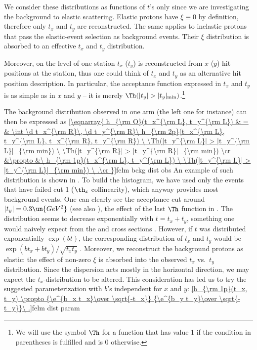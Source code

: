 We consider these distributions as functions of $t$'s only since we are investigating the background to elastic scattering. Elastic protons have $\xi\equiv 0$ by definition, therefore only $t_x$ and $t_y$ are reconstructed. The same applies to inelastic protons that pass the elastic-event selection as background events. Their $\xi$ distribution is absorbed to an effective $t_x$ and $t_y$ distribution.

Moreover, on the level of one station $t_x$ ($t_y$) is reconstructed from $x$ ($y$) hit positions at the station, thus one could think of $t_x$ and $t_y$ as an alternative hit position description. In particular, the acceptance function expressed in $t_x$ and $t_y$ is as simple as in $x$ and $y$ -- it is merely $\Th(|t_y| > |t_y|_{\rm min})$.\footnote{%
We will use the symbol $\Th$ for a function that has value 1 if the condition in parentheses is fulfilled and is 0 otherwise.
}

\bmfig
{}
\emfig

The background distribution observed in one arm (the left one for instance) can then be expressed as
\eqref{\eqnarray{
h_{\rm O}(t_x^{\rm L}, t_y^{\rm L}) & = &
\int \d t_x^{\rm R}\, \d t_y^{\rm R}\ h_{\rm 2p}(t_x^{\rm L}, t_y^{\rm L}, t_x^{\rm R}, t_y^{\rm R})
	\ \Th(|t_y^{\rm L}| > |t_y^{\rm L}|_{\rm min})
	\ \Th(|t_y^{\rm R}| > |t_y^{\rm R}|_{\rm min})
\cr
&\propto &\ h_{\rm 1p}(t_x^{\rm L}, t_y^{\rm L})
	\ \Th(|t_y^{\rm L}| > |t_y^{\rm L}|_{\rm min})
\ .\cr
}}{felm bckg dist obs}
An example of such distribution is shown in . To build the histogram, we have used only the events that have failed cut 1 ($\th_x$ collinearity), which anyway provides most background events. One can clearly see the acceptance cut around $|t_y| = 0.3\un{GeV^2}$ (see also ), the effect of the last $\Th$ function in . The distribution seems to decrease exponentially with $t = t_x + t_y$, something one would naively expect from the  and  cross sections . However, if $t$ was distributed exponentially $\exp(b t)$, the corresponding distribution of $t_x$ and $t_y$ would be $\exp(b t_x + b t_y)/\sqrt{t_x t_y}$
. Moreover, we reconstruct the background protons as elastic: the effect of non-zero $\xi$ is absorbed into the observed $t_x$ vs.~$t_y$ distribution. Since the dispersion acts mostly in the horizontal direction, we may expect the $t_x$-distribution to be altered. This consideration has led us to try the suggested parameterization with $b$'s independent for $x$ and $y$:
\eqref{h_{\rm 1p}(t_x, t_y) \propto {\e^{b_x t_x}\over \sqrt{-t_x}} {\e^{b_y t_y}\over \sqrt{-t_y}}\ .}{felm dist param}

